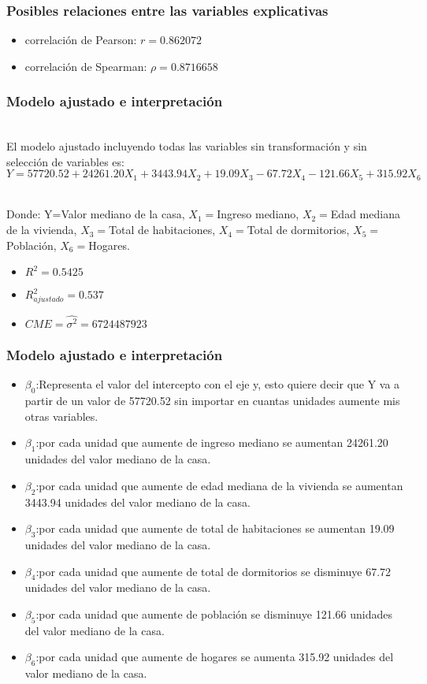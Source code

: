 \documentclass[12pt]{beamer}
\begin{document}
\begin{frame}
\frametitle{Posibles relaciones entre las variables explicativas}
\begin{itemize}
\item correlación de Pearson: $r=0.862072$
\item correlación de Spearman: $\rho=0.8716658$
\end{itemize}
\end{frame}

\begin{frame}
\frametitle{Modelo ajustado e interpretación}
~\\ El modelo ajustado incluyendo todas las variables sin transformación y sin selección de variables es:
~\\ $Y=57720.52+24261.20X_{1}+3443.94X_{2}+19.09X_{3}-67.72X_{4}-121.66X_{5}+315.92X_{6}$

~\\ Donde: Y=Valor mediano de la casa, $X_{1}=$Ingreso mediano, $X_{2}=$Edad mediana de la vivienda, $X_{3}=$Total de habitaciones, $X_{4}=$Total de dormitorios, $X_{5}=$Población, $X_{6}=$Hogares.
\begin{itemize}
\item $R^2=0.5425$
\item $R^2_{ajustado}=0.537$
\item $CME=\hat{\sigma^2}=6724487923$
\end{itemize}
\end{frame}


\begin{frame}
\frametitle{Modelo ajustado e interpretación}
\begin{itemize}
\item $\beta_{0}$:Representa el valor del intercepto con el eje y, esto quiere decir que Y va a partir de un valor de 57720.52 sin importar en cuantas unidades aumente mis otras variables.  
\item $\beta_{1}$:por cada unidad que aumente de ingreso mediano se aumentan 24261.20 unidades del valor mediano de la casa.
\item $\beta_{2}$:por cada unidad que aumente de edad mediana de la vivienda se aumentan 3443.94 unidades del valor mediano de la casa.
\item $\beta_{3}$:por cada unidad que aumente de total de habitaciones se aumentan 19.09 unidades del valor mediano de la casa.
\item $\beta_{4}$:por cada unidad que aumente de total de dormitorios se disminuye 67.72 unidades del valor mediano de la casa.
\end{itemize}
\end{frame}
\begin{frame}
\begin{itemize}
\item $\beta_{5}$:por cada unidad que aumente de población se disminuye 121.66 unidades del valor mediano de la casa.
\item $\beta_{6}$:por cada unidad que aumente de hogares se aumenta 315.92 unidades del valor mediano de la casa.
\end{itemize}
\end{frame}
\end{document}
